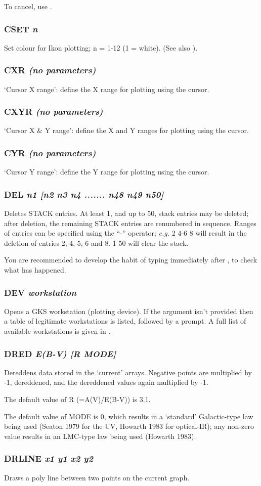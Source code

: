 \documentclass[twoside,11pt,noabs,nolof]{starlink}
\providecommand{\dipcom}[3]{\subsubsection*{\label{COM:#1}\textbf{#1} \emph{#2}}}
\begin{document}
To cancel, use .

\dipcom{CSET}{n}{Sets the plotting colour}
Set colour for Ikon plotting; n = 1-12 (1 = white). (See also ).

\dipcom{CXR}{(no parameters)}{Uses the cursor to define the X range to be plotted}
`Cursor X range': define the X range for plotting using the cursor.

\dipcom{CXYR}{(no parameters)}{Uses the cursor to define the X and Y ranges to be plotted}
`Cursor X \& Y range': define the X and Y ranges for plotting using
the cursor.

\dipcom{CYR}{(no parameters)}{Uses the cursor to define the Y range to be plotted}
`Cursor Y range': define the Y range for plotting using the cursor.

\dipcom{DEL}{n1 [n2 n3 n4 ....... n48 n49 n50]}{Deletes stack entries}
Deletes STACK entries. At least 1, and up to 50, stack entries may be
deleted; after deletion, the remaining STACK entries are renumbered in
sequence. Ranges of entries can be specified using the ``-'' operator;
\emph{e.g.}   2 4-6 8 will result in the deletion of entries 2, 4, 5,
6 and 8.   1-50 will clear the stack.

You are recommended to develop the habit of typing   immediately after
,  to check what has happened.

\dipcom{DEV}{workstation}{Selects a graphics device}
Opens a GKS workstation (plotting device). If the argument isn't
provided then a table of legitimate workstations is listed, followed
by a prompt. A full list of available workstations is given in
.

\dipcom{DRED}{E(B-V) [R MODE]}{De-reddens data}
Dereddens data stored in the `current' arrays. Negative points are
multiplied by -1, dereddened, and the dereddened values again
multiplied by -1.

The default value of R (=A(V)/E(B-V)) is 3.1.

The default value of MODE is 0, which results in a `standard'
Galactic-type law being used (Seaton 1979 for the UV, Howarth 1983 for
optical-IR); any non-zero value results in an LMC-type law being used
(Howarth 1983).

\dipcom{DRLINE}{x1 y1 x2 y2}{Draws a line between two points}
Draws a poly line between two points on the current graph.
\end{document}
